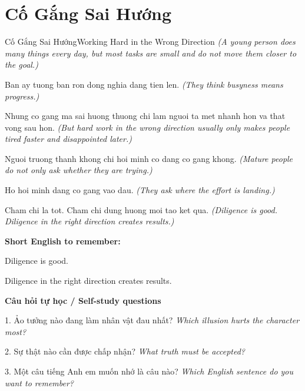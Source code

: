 \section{Cố Gắng Sai Hướng}
\begin{truyen}{Cố Gắng Sai Hướng}{Working Hard in the Wrong Direction}
\textit{(A young person does many things every day, but most tasks are small and do not move them closer to the goal.)}

Ban ay tuong ban ron dong nghia dang tien len.
\textit{(They think busyness means progress.)}

Nhung co gang ma sai huong thuong chi lam nguoi ta met nhanh hon va that vong sau hon.
\textit{(But hard work in the wrong direction usually only makes people tired faster and disappointed later.)}

Nguoi truong thanh khong chi hoi minh co dang co gang khong.
\textit{(Mature people do not only ask whether they are trying.)}

Ho hoi minh dang co gang vao dau.
\textit{(They ask where the effort is landing.)}

\end{truyen}

\begin{baihoc}
Cham chi la tot. Cham chi dung huong moi tao ket qua.
\textit{(Diligence is good. Diligence in the right direction creates results.)}
\end{baihoc}

\begin{ghinhoanh}
\textbf{Short English to remember:}

Diligence is good.

Diligence in the right direction creates results.

\end{ghinhoanh}

\begin{tuhocnhanh}
\textbf{Câu hỏi tự học / Self-study questions}

1. Ảo tưởng nào đang làm nhân vật đau nhất? \textit{Which illusion hurts the character most?}

2. Sự thật nào cần được chấp nhận? \textit{What truth must be accepted?}

3. Một câu tiếng Anh em muốn nhớ là câu nào? \textit{Which English sentence do you want to remember?}
\end{tuhocnhanh}
\ngancach

